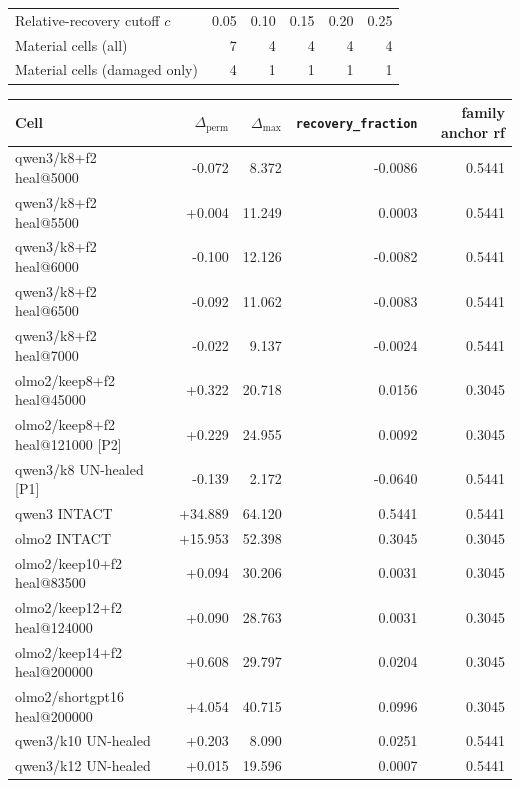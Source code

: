 \begin{table}[H]
\centering
\small
\begin{tabular}{@{}lrrrrr@{}}
\toprule
Relative-recovery cutoff $c$ & 0.05 & 0.10 & 0.15 & 0.20 & 0.25 \\
Material cells (all) & 7 & 4 & 4 & 4 & 4 \\
Material cells (damaged only) & 4 & 1 & 1 & 1 & 1 \\
\bottomrule
\end{tabular}

\vspace{4pt}
\footnotesize
\setlength{\tabcolsep}{4.2pt}
\begin{tabular}{lrrrr}
\toprule
Cell & $\Delta_{\mathrm{perm}}$ & $\Delta_{\max}$ & \texttt{recovery\_fraction} & family anchor rf \\
\midrule
qwen3/k8+f2 heal@5000 & -0.072 & 8.372 & -0.0086 & 0.5441 \\
qwen3/k8+f2 heal@5500 & +0.004 & 11.249 & 0.0003 & 0.5441 \\
qwen3/k8+f2 heal@6000 & -0.100 & 12.126 & -0.0082 & 0.5441 \\
qwen3/k8+f2 heal@6500 & -0.092 & 11.062 & -0.0083 & 0.5441 \\
qwen3/k8+f2 heal@7000 & -0.022 & 9.137 & -0.0024 & 0.5441 \\
olmo2/keep8+f2 heal@45000 & +0.322 & 20.718 & 0.0156 & 0.3045 \\
olmo2/keep8+f2 heal@121000 [P2] & +0.229 & 24.955 & 0.0092 & 0.3045 \\
qwen3/k8 UN-healed [P1] & -0.139 & 2.172 & -0.0640 & 0.5441 \\
qwen3 INTACT & +34.889 & 64.120 & 0.5441 & 0.5441 \\
olmo2 INTACT & +15.953 & 52.398 & 0.3045 & 0.3045 \\
olmo2/keep10+f2 heal@83500 & +0.094 & 30.206 & 0.0031 & 0.3045 \\
olmo2/keep12+f2 heal@124000 & +0.090 & 28.763 & 0.0031 & 0.3045 \\
olmo2/keep14+f2 heal@200000 & +0.608 & 29.797 & 0.0204 & 0.3045 \\
olmo2/shortgpt16 heal@200000 & +4.054 & 40.715 & 0.0996 & 0.3045 \\
qwen3/k10 UN-healed & +0.203 & 8.090 & 0.0251 & 0.5441 \\
qwen3/k12 UN-healed & +0.015 & 19.596 & 0.0007 & 0.5441 \\

\end{tabular}
\end{table}

